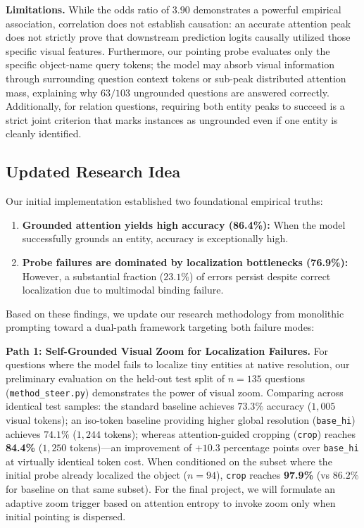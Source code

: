 \documentclass{article}
\begin{document}
\textbf{Limitations.} While the odds ratio of $3.90$ demonstrates a powerful empirical association, correlation does not establish causation: an accurate attention peak does not strictly prove that downstream prediction logits causally utilized those specific visual features. Furthermore, our pointing probe evaluates only the specific object-name query tokens; the model may absorb visual information through surrounding question context tokens or sub-peak distributed attention mass, explaining why $63/103$ ungrounded questions are answered correctly. Additionally, for relation questions, requiring both entity peaks to succeed is a strict joint criterion that marks instances as ungrounded even if one entity is cleanly identified.

\subsection{Updated Research Idea}

Our initial implementation established two foundational empirical truths:
\begin{enumerate}
    \item \textbf{Grounded attention yields high accuracy (86.4\%):} When the model successfully grounds an entity, accuracy is exceptionally high.
    \item \textbf{Probe failures are dominated by localization bottlenecks (76.9\%):} However, a substantial fraction ($23.1\%$) of errors persist despite correct localization due to multimodal binding failure.
\end{enumerate}

Based on these findings, we update our research methodology from monolithic prompting toward a dual-path framework targeting both failure modes:

\textbf{Path 1: Self-Grounded Visual Zoom for Localization Failures.}
For questions where the model fails to localize tiny entities at native resolution, our preliminary evaluation on the held-out test split of $n=135$ questions (\texttt{method\_steer.py}) demonstrates the power of visual zoom. Comparing across identical test samples: the standard baseline achieves $73.3\%$ accuracy ($1,005$ visual tokens); an iso-token baseline providing higher global resolution (\texttt{base\_hi}) achieves $74.1\%$ ($1,244$ tokens); whereas attention-guided cropping (\texttt{crop}) reaches \textbf{84.4\%} ($1,250$ tokens)---an improvement of $+10.3$ percentage points over \texttt{base\_hi} at virtually identical token cost. When conditioned on the subset where the initial probe already localized the object ($n=94$), \texttt{crop} reaches \textbf{97.9\%} (vs $86.2\%$ for baseline on that same subset). For the final project, we will formulate an adaptive zoom trigger based on attention entropy to invoke zoom only when initial pointing is dispersed.
\end{document}

